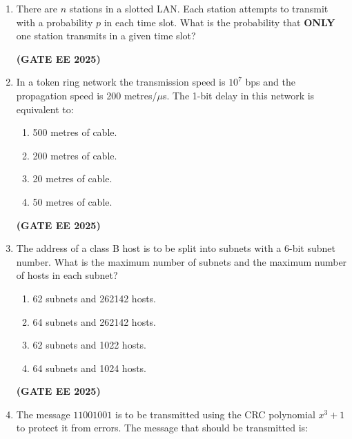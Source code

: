 \documentclass[journal,12pt,onecolumn]{IEEEtran}
\theoremstyle{remark}
\begin{document}
\begin {center}
\begin{enumerate}
    \hfill \textbf{(GATE EE 2025)}
    \item There are $n$ stations in a slotted LAN. Each station attempts to transmit with a probability $p$ in each time slot. What is the probability that \textbf{ONLY} one station transmits in a given time slot?  
    \begin{enumerate}
    \end{enumerate}
\hfill \textbf{(GATE EE 2025)}
    \item In a token ring network the transmission speed is $10^{7}$ bps and the propagation speed is 200 metres/$\mu$s. The 1-bit delay in this network is equivalent to:  
    \begin{enumerate}
        \item 500 metres of cable.
        \item 200 metres of cable.
        \item 20 metres of cable.
        \item 50 metres of cable.
    \end{enumerate}
\hfill \textbf{(GATE EE 2025)}
    \item The address of a class B host is to be split into subnets with a 6-bit subnet number. What is the maximum number of subnets and the maximum number of hosts in each subnet?  
    \begin{enumerate}
        \item 62 subnets and 262142 hosts.
        \item 64 subnets and 262142 hosts.
        \item 62 subnets and 1022 hosts.
        \item 64 subnets and 1024 hosts.
    \end{enumerate}
\hfill \textbf{(GATE EE 2025)}
    \item The message $11001001$ is to be transmitted using the CRC polynomial $x^3 + 1$ to protect it from errors. The message that should be transmitted is:  
    \begin{enumerate}
\end{enumerate}
\end{enumerate}
\end{center}
\end{document}
